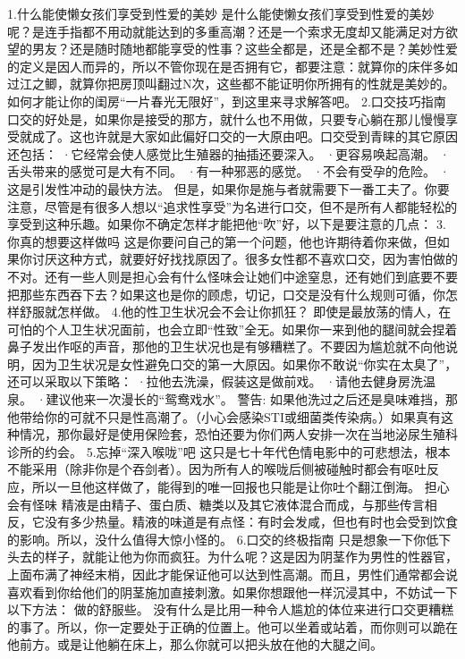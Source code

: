 \documentclass[12pt,UTF8]{ctexbook}
\begin{document}
1.什么能使懒女孩们享受到性爱的美妙
是什么能使懒女孩们享受到性爱的美妙呢？是连手指都不用动就能达到的多重高潮？还是一个索求无度却又能满足对方欲望的男友？还是随时随地都能享受的性事？这些全都是，还是全都不是？美妙性爱的定义是因人而异的，所以不管你现在是否拥有它，都要注意：就算你的床伴多如过江之鲫，就算你把房顶叫翻过N次，这些都不能证明你所拥有的性就是美妙的。
如何才能让你的闺房“一片春光无限好”，到这里来寻求解答吧。
2.口交技巧指南
口交的好处是，如果你是接受的那方，就什么也不用做，只要专心躺在那儿慢慢享受就成了。这也许就是大家如此偏好口交的一大原由吧。口交受到青睐的其它原因还包括：
·它经常会使人感觉比生殖器的抽插还要深入。
·更容易唤起高潮。
·舌头带来的感觉可是大有不同。
·有一种邪恶的感觉。
·不会有受孕的危险。
·这是引发性冲动的最快方法。
但是，如果你是施与者就需要下一番工夫了。你要注意，尽管是有很多人想以“追求性享受”为名进行口交，但不是所有人都能轻松的享受到这种乐趣。如果你不确定怎样才能把他“吹”好，以下是要注意的几点：
3.你真的想要这样做吗
这是你要问自己的第一个问题，他也许期待着你来做，但如果你讨厌这种方式，就要好好找找原因了。很多女性都不喜欢口交，因为害怕做的不对。还有一些人则是担心会有什么怪味会让她们中途窒息，还有她们到底要不要把那些东西吞下去？如果这也是你的顾虑，切记，口交是没有什么规则可循，你怎样舒服就怎样做。
4.他的性卫生状况会不会让你抓狂？
即使是最放荡的情人，在可怕的个人卫生状况面前，也会立即“性致”全无。如果你一来到他的腿间就会捏着鼻子发出作呕的声音，那他的卫生状况也是有够糟糕了。不要因为尴尬就不向他说明，因为卫生状况是女性避免口交的第一大原因。如果你不敢说“你实在太臭了”，还可以采取以下策略：
·拉他去洗澡，假装这是做前戏。
·请他去健身房洗温泉。
·建议他来一次漫长的“鸳鸯戏水”。
警告:
如果他洗过之后还是臭味难挡，那他带给你的可就不只是性高潮了。（小心会感染STI或细菌类传染病。）如果真有这种情况，那你最好是使用保险套，恐怕还要为你们两人安排一次在当地泌尿生殖科诊所的约会。
5.忘掉“深入喉咙”吧
这只是七十年代色情电影中的可悲想法，根本不能采用（除非你是个吞剑者）。因为所有人的喉咙后侧被碰触时都会有呕吐反应，所以一旦他这样做了，能得到的唯一回报也只能是让你吐个翻江倒海。
担心会有怪味
精液是由精子、蛋白质、糖类以及其它液体混合而成，与那些传言相反，它没有多少热量。精液的味道是有点怪：有时会发咸，但也有时也会受到饮食的影响。所以，没什么值得大惊小怪的。
6.口交的终极指南
只是想象一下你低下头去的样子，就能让他为你而疯狂。为什么呢？这是因为阴茎作为男性的性器官，上面布满了神经末梢，因此才能保证他可以达到性高潮。而且，男性们通常都会说喜欢看到你给他们的阴茎施加直接刺激。如果你想跟他一样沉浸其中，不妨试一下以下方法：
做的舒服些。
没有什么是比用一种令人尴尬的体位来进行口交更糟糕的事了。所以，你一定要处于正确的位置上。他可以坐着或站着，而你则可以跪在他前方。或是让他躺在床上，那么你就可以把头放在他的大腿之间。
\end{document}

